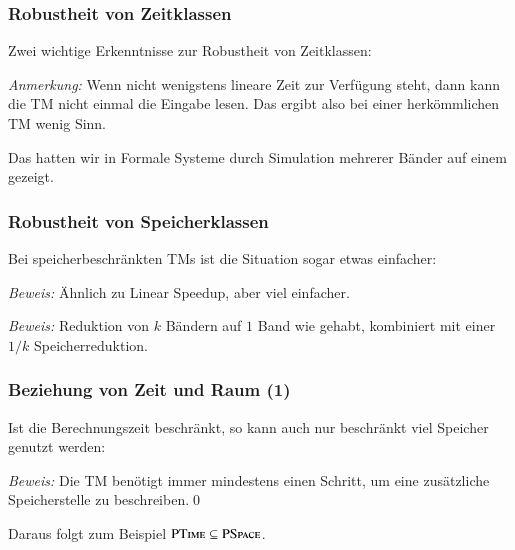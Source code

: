 \documentclass[aspectratio=1610,onlymath]{beamer}
\begin{document}
\begin{frame}\frametitle{Robustheit von Zeitklassen}

Zwei wichtige Erkenntnisse zur Robustheit von Zeitklassen:
\bigskip

\bigskip

\emph{Anmerkung:} Wenn nicht wenigstens lineare Zeit zur Verfügung steht, dann kann die TM nicht einmal die Eingabe lesen. Das ergibt also bei einer herkömmlichen TM wenig Sinn.
\bigskip\pause

\bigskip

Das hatten wir in Formale Systeme durch Simulation mehrerer Bänder auf einem gezeigt.

\end{frame}

\begin{frame}\frametitle{Robustheit von Speicherklassen}

Bei speicherbeschränkten TMs ist die Situation sogar etwas einfacher:
\bigskip

\bigskip\pause

\emph{Beweis:} Ähnlich zu Linear Speedup, aber viel einfacher.\bigskip\pause

\bigskip\pause

\emph{Beweis:} Reduktion von $k$ Bändern auf $1$ Band wie gehabt, kombiniert mit einer $1/k$ Speicherreduktion.

\end{frame}


\begin{frame}\frametitle{Beziehung von Zeit und Raum (1)}

Ist die Berechnungszeit beschränkt, so kann auch nur beschränkt viel 
Speicher genutzt werden:\bigskip


\emph{Beweis:} Die TM benötigt immer mindestens einen Schritt, um eine zusätzliche Speicherstelle zu beschreiben.\qed\bigskip

\pause Daraus folgt zum Beispiel ${\textsc{PTime}}\subseteq{\textsc{PSpace}}$.

\end{frame}
\end{document}
